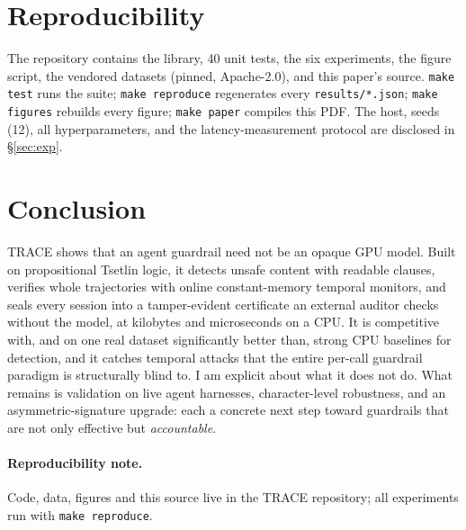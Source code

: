 \documentclass[11pt]{article}
\begin{document}
\section{Reproducibility}
The repository contains the library, 40 unit tests, the six experiments, the
figure script, the vendored datasets (pinned, Apache-2.0), and this paper's
source. \texttt{make test} runs the suite; \texttt{make reproduce} regenerates
every \texttt{results/*.json}; \texttt{make figures} rebuilds every figure;
\texttt{make paper} compiles this PDF. The host, seeds (12), all hyperparameters,
and the latency-measurement protocol are disclosed in \S\ref{sec:exp}.

\section{Conclusion}
TRACE shows that an agent guardrail need not be an opaque GPU model. Built on
propositional Tsetlin logic, it detects unsafe content with readable clauses,
verifies whole trajectories with online constant-memory temporal monitors, and
seals every session into a tamper-evident certificate an external auditor checks
without the model, at kilobytes and microseconds on a CPU. It is competitive
with, and on one real dataset significantly better than, strong CPU baselines for
detection, and it catches temporal attacks that the entire per-call guardrail
paradigm is structurally blind to. I am explicit about what it does not do.
What remains is validation on live agent harnesses, character-level robustness,
and an asymmetric-signature upgrade: each a concrete next step toward guardrails
that are not only effective but \emph{accountable}.

\paragraph{Reproducibility note.} Code, data, figures and this source live in the
TRACE repository; all experiments run with \texttt{make reproduce}.


\end{document}
